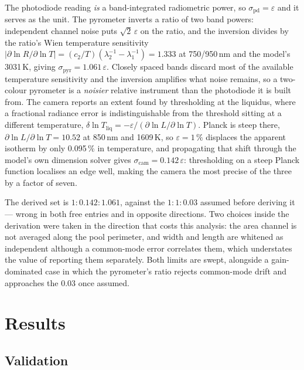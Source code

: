 \documentclass[preprint,times]{elsarticle}
\begin{document}
The photodiode reading \emph{is} a band-integrated radiometric power, so
$\sigma_{\mathrm{pd}} = \varepsilon$ and it serves as the unit. The pyrometer
inverts a ratio of two band powers: independent channel noise puts
$\sqrt{2}\,\varepsilon$ on the ratio, and the inversion divides by the ratio's
Wien temperature sensitivity $|\partial \ln R/\partial \ln T| = (c_2/T)
(\lambda_2^{-1}-\lambda_1^{-1}) = 1.333$ at 750/950\,nm and the model's 3031\,K,
giving $\sigma_{\mathrm{pyr}} = 1.061\,\varepsilon$. Closely spaced bands discard most of the
available temperature sensitivity and the inversion amplifies what noise remains,
so a two-colour pyrometer is a \emph{noisier} relative instrument than the
photodiode it is built from. The camera reports an extent found
by thresholding at the liquidus, where a fractional radiance error is
indistinguishable from the threshold sitting at a different temperature,
$\delta \ln T_{\mathrm{liq}} = -\varepsilon/(\partial \ln L/\partial \ln T)$.
Planck is steep there, $\partial \ln L/\partial \ln T = 10.52$ at 850\,nm and
1609\,K, so $\varepsilon = 1\,\%$ displaces the apparent isotherm by only
0.095\,\% in temperature, and propagating that shift through the model's own
dimension solver gives $\sigma_{\mathrm{cam}} = 0.142\,\varepsilon$: thresholding
on a steep Planck function localises an edge well, making the camera the most
precise of the three by a factor of seven.

The derived set is $1 : 0.142 : 1.061$, against the $1 : 1 : 0.03$ assumed before
deriving it --- wrong in both free entries and in opposite directions. Two choices
inside the derivation were taken in the direction that costs this analysis: the
area channel is not averaged along the pool perimeter, and width and length are
whitened as independent although a common-mode error correlates them, which
understates the value of reporting them separately. Both limits are swept,
alongside a gain-dominated case in which the pyrometer's ratio rejects
common-mode drift and approaches the 0.03 once assumed.

\section{Results}

\subsection{Validation}
\label{sec:valid}
\end{document}

